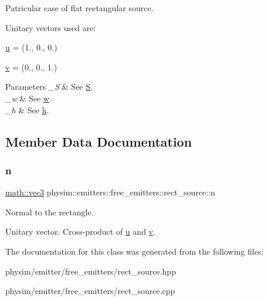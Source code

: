Patricular case of flat rectangular source. 

Unitary vectors used are\+:
\begin{DoxyItemize}
\item \hyperlink{classphysim_1_1emitters_1_1free__emitters_1_1rect__source_a692e4b1fd9e74b5c7692cad3f0c184c4}{u} = (1., 0., 0.)
\item \hyperlink{classphysim_1_1emitters_1_1free__emitters_1_1rect__source_a9540156884818d3f6b0ed86a1b0902d0}{v} = (0., 0., 1.) 
\begin{DoxyParams}{Parameters}
{\em \+\_\+S} & See \hyperlink{classphysim_1_1emitters_1_1free__emitters_1_1rect__source_a0d958945449e9d31e95b154f942b21ca}{S}. \\
\hline
{\em \+\_\+w} & See \hyperlink{classphysim_1_1emitters_1_1free__emitters_1_1rect__source_ab6e88219088b1048622242f7f2d03f91}{w}. \\
\hline
{\em \+\_\+h} & See \hyperlink{classphysim_1_1emitters_1_1free__emitters_1_1rect__source_aebabbc2dc4e697b10d37e54d998f1146}{h}. \\
\hline
\end{DoxyParams}

\end{DoxyItemize}

\subsection{Member Data Documentation}
\mbox{\label{classphysim_1_1emitters_1_1free__emitters_1_1rect__source_a0ce1fc34b505b94cdbc22cdb05047142}} 
\subsubsection{\texorpdfstring{n}{n}}
{\footnotesize\ttfamily \hyperlink{structphysim_1_1math_1_1vec3}{math\+::vec3} physim\+::emitters\+::free\+\_\+emitters\+::rect\+\_\+source\+::n\hspace{0.3cm}{\ttfamily [protected]}}



Normal to the rectangle. 

Unitary vector. Cross-\/product of \hyperlink{classphysim_1_1emitters_1_1free__emitters_1_1rect__source_a692e4b1fd9e74b5c7692cad3f0c184c4}{u} and \hyperlink{classphysim_1_1emitters_1_1free__emitters_1_1rect__source_a9540156884818d3f6b0ed86a1b0902d0}{v}. 

The documentation for this class was generated from the following files\+:\begin{DoxyCompactItemize}
\item 
physim/emitter/free\+\_\+emitters/rect\+\_\+source.\+hpp\item 
physim/emitter/free\+\_\+emitters/rect\+\_\+source.\+cpp\end{DoxyCompactItemize}
